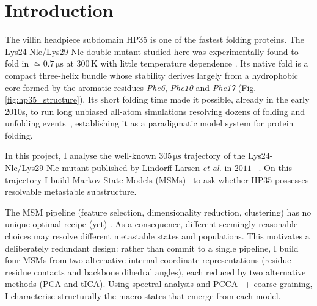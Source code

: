 \documentclass[prl,twocolumn]{revtex4-1}
\begin{document}
\section{Introduction}
The villin headpiece subdomain HP35  is one of the fastest folding proteins. The Lys24-Nle/Lys29-Nle double mutant studied here was experimentally found to fold in $\simeq 0.7\,\mathrm{\mu s}$ at $300\,\mathrm{K}$ with little temperature dependence  \cite{PDB}. Its native fold is a compact three-helix bundle whose stability derives largely from a hydrophobic core formed by the aromatic residues \textit{Phe6}, \textit{Phe10} and \textit{Phe17} (Fig.\ref{fig:hp35_structure}).  Its short folding time made it possible, already in the early 2010s, to run long unbiased all-atom simulations resolving dozens of folding and unfolding events~\cite{Lindorff-Larsen2011}, establishing it as a paradigmatic model system for protein folding.

In this project, I analyse the well-known $305\,\mathrm{\mu s}$ trajectory of the Lys24-Nle/Lys29-Nle mutant published by Lindorff-Larsen \textit{et al.} in $2011$ ~\cite{Lindorff-Larsen2011}. %
On this trajectory I build Markov State Models (MSMs)~\cite{thebible} to ask whether HP35 possesses resolvable metastable substructure.

The MSM pipeline (feature selection, dimensionality reduction, clustering) has no unique optimal recipe (yet) \cite{Sittel2018, towards_a_benchmark}. As a consequence, different seemingly reasonable choices may resolve different metastable states and populations. This motivates a deliberately redundant design: rather than commit to a single pipeline, 
I build four MSMs from two alternative internal-coordinate representations (residue–residue contacts and backbone dihedral angles), each reduced by two alternative methods (PCA and tICA). Using spectral analysis and PCCA++ coarse-graining, I characterise structurally the macro-states that emerge from each model.
%
%
\end{document}
